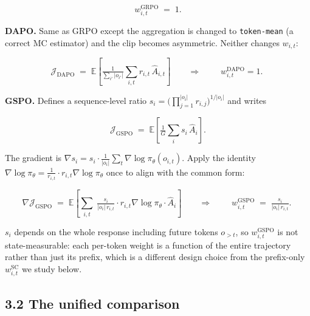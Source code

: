 \documentclass[11pt,a4paper]{article}
\theoremstyle{remark}
\begin{document}
\begin{equation*}
\boxed{\;w_{i,t}^{\text{GRPO}} \;=\; 1.\;}
\end{equation*}


\textbf{DAPO.} Same as GRPO except the aggregation is changed to \texttt{token-mean} (a correct MC estimator) and the clip becomes asymmetric. Neither changes $w_{i,t}$:


\begin{equation*}
\mathcal J_{\text{DAPO}} \;=\; \mathbb E\!\left[\tfrac{1}{\sum_{i'}|o_{i'}|}\sum_{i,t} r_{i,t}\,\hat A_{i,t}\right]
\qquad\Longrightarrow\qquad
\boxed{\;w_{i,t}^{\text{DAPO}}=1.\;}
\end{equation*}


\textbf{GSPO.} Defines a sequence-level ratio $s_i=\big(\prod_{j=1}^{|o_i|}r_{i,j}\big)^{1/|o_i|}$ and writes


\begin{equation*}
\mathcal J_{\text{GSPO}} \;=\; \mathbb E\!\left[\tfrac{1}{G}\sum_i s_i\,\hat A_i\right].
\end{equation*}


The gradient is $\nabla s_i = s_i\cdot\tfrac{1}{|o_i|}\sum_t\nabla\log\pi_\theta(o_{i,t})$. Apply the identity $\nabla\log\pi_\theta = \tfrac{1}{r_{i,t}}\cdot r_{i,t}\nabla\log\pi_\theta$ once to align with the common form:


\begin{equation*}
\nabla\mathcal J_{\text{GSPO}} \;=\; \mathbb E\!\left[\sum_{i,t}\;\tfrac{s_i}{|o_i|\,r_{i,t}}\cdot r_{i,t}\nabla\log\pi_\theta\cdot\hat A_i\right]
\qquad\Longrightarrow\qquad
\boxed{\;w_{i,t}^{\text{GSPO}} \;=\; \tfrac{s_i}{|o_i|\,r_{i,t}}.\;}
\end{equation*}


$s_i$ depends on the whole response including future tokens $o_{>t}$, so $w_{i,t}^{\text{GSPO}}$ is not state-measurable: each per-token weight is a function of the entire trajectory rather than just its prefix, which is a different design choice from the prefix-only $w_{i,t}^{\text{SC}}$ we study below.

\subsection*{3.2 The unified comparison}
\end{document}
